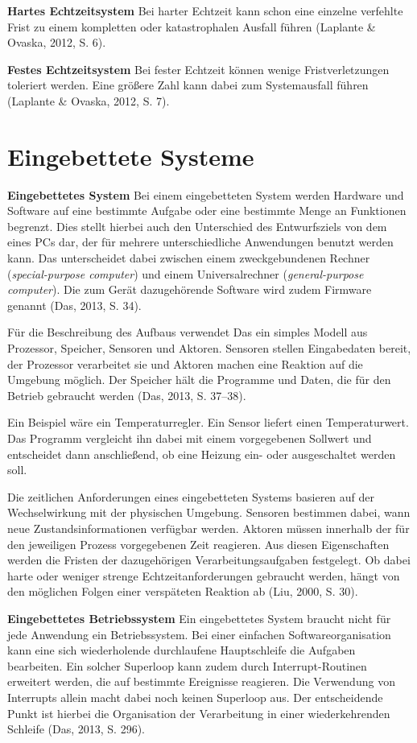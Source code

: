 \textbf{Hartes Echtzeitsystem} Bei harter Echtzeit kann schon eine einzelne verfehlte Frist zu einem kompletten oder katastrophalen Ausfall führen (Laplante \& Ovaska, 2012, S. 6).

\textbf{Festes Echtzeitsystem} Bei fester Echtzeit können wenige Fristverletzungen toleriert werden. Eine größere Zahl kann dabei zum Systemausfall führen (Laplante \& Ovaska, 2012, S. 7).

\section{Eingebettete Systeme}
\textbf{Eingebettetes System} Bei einem eingebetteten System werden Hardware und Software auf eine bestimmte Aufgabe oder eine bestimmte Menge an Funktionen begrenzt. Dies stellt hierbei auch den Unterschied des Entwurfsziels von dem eines PCs dar, der für mehrere unterschiedliche Anwendungen benutzt werden kann. Das unterscheidet dabei zwischen einem zweckgebundenen Rechner (\emph{special-purpose computer}) und einem Universalrechner (\emph{general-purpose computer}). Die zum Gerät dazugehörende Software wird zudem Firmware genannt (Das, 2013, S. 34).

Für die Beschreibung des Aufbaus verwendet Das ein simples Modell aus Prozessor, Speicher, Sensoren und Aktoren. Sensoren stellen Eingabedaten bereit, der Prozessor verarbeitet sie und Aktoren machen eine Reaktion auf die Umgebung möglich. Der Speicher hält die Programme und Daten, die für den Betrieb gebraucht werden (Das, 2013, S. 37–38).

Ein Beispiel wäre ein Temperaturregler. Ein Sensor liefert einen Temperaturwert. Das Programm vergleicht ihn dabei mit einem vorgegebenen Sollwert und entscheidet dann anschließend, ob eine Heizung ein- oder ausgeschaltet werden soll.

Die zeitlichen Anforderungen eines eingebetteten Systems basieren auf der Wechselwirkung mit der physischen Umgebung. Sensoren bestimmen dabei, wann neue Zustandsinformationen verfügbar werden. Aktoren müssen innerhalb der für den jeweiligen Prozess vorgegebenen Zeit reagieren. Aus diesen Eigenschaften werden die Fristen der dazugehörigen Verarbeitungsaufgaben festgelegt. Ob dabei harte oder weniger strenge Echtzeitanforderungen gebraucht werden, hängt von den möglichen Folgen einer verspäteten Reaktion ab (Liu, 2000, S. 30).

\textbf{Eingebettetes Betriebssystem }Ein eingebettetes System braucht nicht für jede Anwendung ein Betriebssystem. Bei einer einfachen Softwareorganisation kann eine sich wiederholende durchlaufene Hauptschleife die Aufgaben bearbeiten. Ein solcher Superloop kann zudem durch Interrupt-Routinen erweitert werden, die auf bestimmte Ereignisse reagieren. Die Verwendung von Interrupts allein macht dabei noch keinen Superloop aus. Der entscheidende Punkt ist hierbei die Organisation der Verarbeitung in einer wiederkehrenden Schleife (Das, 2013, S. 296).

